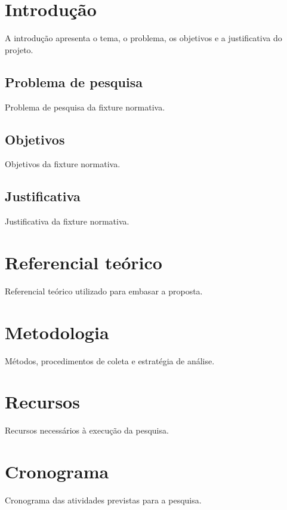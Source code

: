 \documentclass{ufctex}
\begin{document}
\pretextual

\imprimircapa
\imprimirfolhaderosto
\imprimirsumario

\textual
\section{Introdução}
A introdução apresenta o tema, o problema, os objetivos e a justificativa do projeto.

\subsection{Problema de pesquisa}
Problema de pesquisa da fixture normativa.

\subsection{Objetivos}
Objetivos da fixture normativa.

\subsection{Justificativa}
Justificativa da fixture normativa.

\section{Referencial teórico}
Referencial teórico utilizado para embasar a proposta.

\section{Metodologia}
Métodos, procedimentos de coleta e estratégia de análise.

\section{Recursos}
Recursos necessários à execução da pesquisa.

\section{Cronograma}
Cronograma das atividades previstas para a pesquisa.

\nocite{silva2020}
\imprimirreferencias
\end{document}
